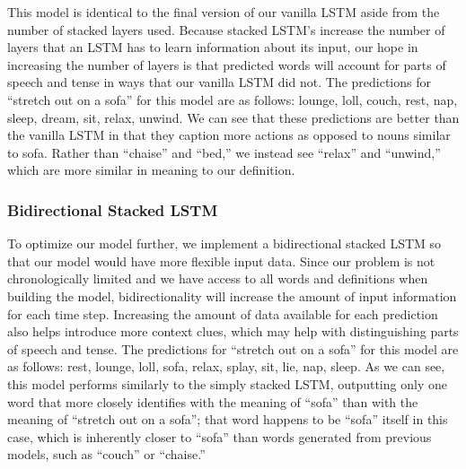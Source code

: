 \documentclass{article} %
\begin{document}

This model is identical to the final version of our vanilla LSTM aside from the number of stacked layers used. Because stacked LSTM’s increase the number of layers that an LSTM has to learn information about its input, our hope in increasing the number of layers is that predicted words will account for parts of speech and tense in ways that our vanilla LSTM did not.
The predictions for “stretch out on a sofa” for this model are as follows: lounge, loll, couch, rest, nap, sleep, dream, sit, relax, unwind.
We can see that these predictions are better than the vanilla LSTM in that they caption more actions as opposed to nouns similar to sofa. Rather than “chaise” and “bed,” we instead see “relax” and “unwind,” which are more similar in meaning to our definition. 

\subsubsection{Bidirectional Stacked LSTM}
To optimize our model further, we implement a bidirectional stacked LSTM so that our model would have more flexible input data. Since our problem is not chronologically limited and we have access to all words and definitions when building the model, bidirectionality will increase the amount of input information for each time step. Increasing the amount of data available for each prediction also helps introduce more context clues, which may help with distinguishing parts of speech and tense.  
The predictions for “stretch out on a sofa” for this model are as follows: rest, lounge, loll, sofa, relax, splay, sit, lie, nap, sleep.
As we can see, this model performs similarly to the simply stacked LSTM, outputting only one word that more closely identifies with the meaning of “sofa” than with the meaning of “stretch out on a sofa”; that word happens to be “sofa” itself in this case, which is inherently closer to “sofa” than words generated from previous models, such as “couch” or “chaise.”
\end{document}
